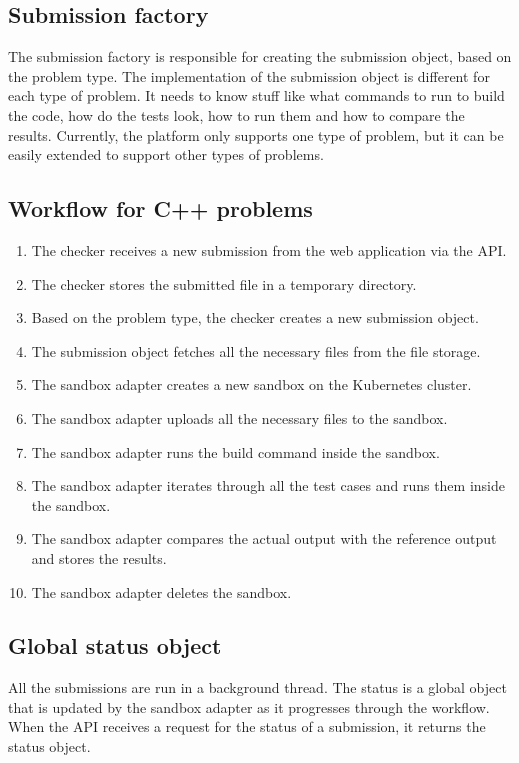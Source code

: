 \documentclass[12pt,a4paper]{report}
\begin{document}
\subsection{Submission factory}
The submission factory is responsible for creating the submission object, based on the problem type. The implementation of the submission object is different for each type of problem. It needs to know stuff like what commands to run to build the code, how do the tests look, how to run them and how to compare the results. Currently, the platform only supports one type of problem, but it can be easily extended to support other types of problems.

\subsection{Workflow for C++ problems}
\begin{enumerate}
	\item The checker receives a new submission from the web application via the API.
	\item The checker stores the submitted file in a temporary directory.
	\item Based on the problem type, the checker creates a new submission object.
	\item The submission object fetches all the necessary files from the file storage.
	\item The sandbox adapter creates a new sandbox on the Kubernetes cluster.
	\item The sandbox adapter uploads all the necessary files to the sandbox.
	\item The sandbox adapter runs the build command inside the sandbox.
	\item The sandbox adapter iterates through all the test cases and runs them inside the sandbox.
	\item The sandbox adapter compares the actual output with the reference output and stores the results.
	\item The sandbox adapter deletes the sandbox.
\end{enumerate}


\subsection{Global status object}
All the submissions are run in a background thread. The status is a global object that is updated by the sandbox adapter as it progresses through the workflow. When the API receives a request for the status of a submission, it returns the status object.
\end{document}
